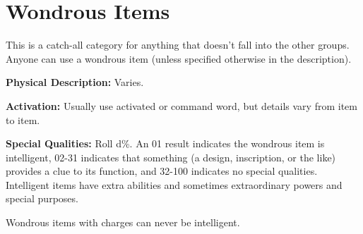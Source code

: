 
\section{Wondrous Items}

This is a catch-all category for anything that doesn't fall into the other groups. 
Anyone can use a wondrous item (unless specified otherwise in the description).

\textbf{Physical Description:} Varies.

\textbf{Activation:} Usually use activated or command word, but details vary from 
item to item.

\textbf{Special Qualities:} Roll d\%. An 01 result indicates the wondrous item 
is intelligent, 02-31 indicates that something (a design, inscription, or the like) 
provides a clue to its function, and 32-100 indicates no special qualities. Intelligent 
items have extra abilities and sometimes extraordinary powers and special purposes.

Wondrous items with charges can never be intelligent.

